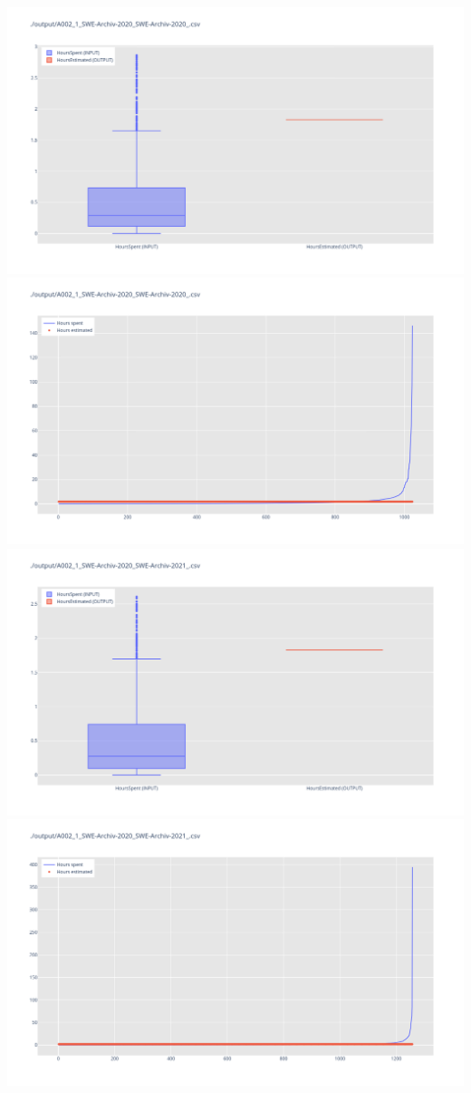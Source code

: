 \includegraphics[width=\textwidth]{Scripts/output/A002_1_SWE-Archiv-2020_SWE-Archiv-2020_.csv.png}
\includegraphics[width=\textwidth]{Scripts/output/A002_1_SWE-Archiv-2020_SWE-Archiv-2020_.csv.scatter.png}
\includegraphics[width=\textwidth]{Scripts/output/A002_1_SWE-Archiv-2020_SWE-Archiv-2021_.csv.png}
\includegraphics[width=\textwidth]{Scripts/output/A002_1_SWE-Archiv-2020_SWE-Archiv-2021_.csv.scatter.png}
